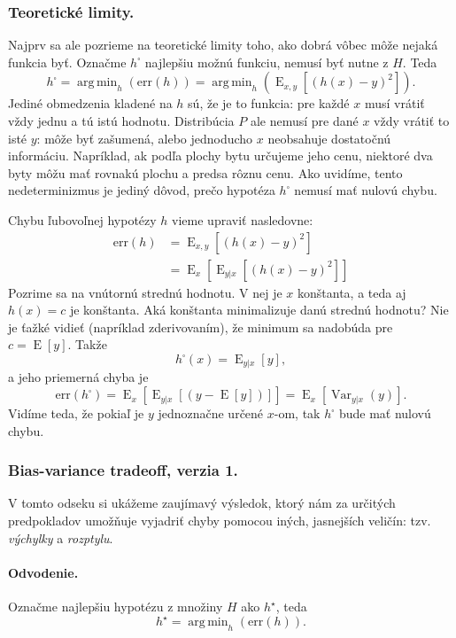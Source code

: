 \documentclass[a4paper,11pt]{article}
\theoremstyle{plain}
\theoremstyle{remark}
\theoremstyle{definition}
\newcommand{\err}{\mathrm{err}}
\DeclareMathOperator*{\argmin}{arg\,min}
\DeclareMathOperator*{\E}{\mathrm{E}}
\DeclareMathOperator*{\Var}{\mathrm{Var}}
\begin{document}
  \subsubsection{Teoretické limity.}
  Najprv sa ale pozrieme na teoretické limity toho, ako dobrá vôbec
  môže nejaká funkcia byť. Označme $h^{\square}$ najlepšiu možnú funkciu,
  nemusí byť nutne z $H$. Teda
  $$h^{\square} = \argmin_h \left( \err(h) \right) = \argmin_h \left( \E_{x,y} \left[ (h(x) - y)^2 \right] \right).$$
  Jediné obmedzenia kladené na $h$ sú, že je to funkcia: pre každé $x$
  musí vrátiť vždy jednu a tú istú hodnotu. Distribúcia $P$ ale nemusí
  pre dané $x$ vždy vrátiť to isté $y$: môže byť zašumená, alebo
  jednoducho $x$ neobsahuje dostatočnú informáciu. Napríklad, ak podľa
  plochy bytu určujeme jeho cenu, niektoré dva byty môžu mať rovnakú
  plochu a predsa rôznu cenu. Ako uvidíme, tento nedeterminizmus je
  jediný dôvod, prečo hypotéza $h^{\square}$ nemusí mať nulovú chybu.
  
  Chybu ľubovoľnej hypotézy $h$ vieme upraviť nasledovne:
  \begin{align}
    \err(h)
      &= \E_{x,y} \left[ (h(x) - y)^2 \right] \\
      &= \E_{x} \left[ \E_{y|x} \left[ (h(x) - y)^2 \right] \right]
  \end{align}
  Pozrime sa na vnútornú strednú hodnotu. V nej je $x$ konštanta, a
  teda aj $h(x) = c$ je konštanta. Aká konštanta minimalizuje danú
  strednú hodnotu? Nie je ťažké vidieť (napríklad zderivovaním), že
  minimum sa nadobúda pre $c = \E[y]$. Takže
  $$h^{\square}(x) = \E_{y|x}[y],$$
  a jeho priemerná chyba je
  $$\err(h^{\square}) = \E_{x} \left[ \E_{y|x} \left[ (y - \E[y]) \right] \right] = \E_{x} \left[ \Var_{y|x}(y) \right].$$
  Vidíme teda, že pokiaľ je $y$ jednoznačne určené $x$-om, tak
  $h^{\square}$ bude mať nulovú chybu.
  
  \subsubsection{Bias-variance tradeoff, verzia 1.}
  V tomto odseku si ukážeme zaujímavý výsledok, ktorý nám za určitých
  predpokladov umožňuje vyjadriť chyby pomocou iných, jasnejších veličín:
  tzv. \emph{výchylky} a \emph{rozptylu}.
  
  \paragraph{Odvodenie.}
  Označme najlepšiu hypotézu z množiny $H$ ako $h^\star$, teda
  $$h^\star = \argmin_h \left( \err(h) \right).$$
\end{document}
